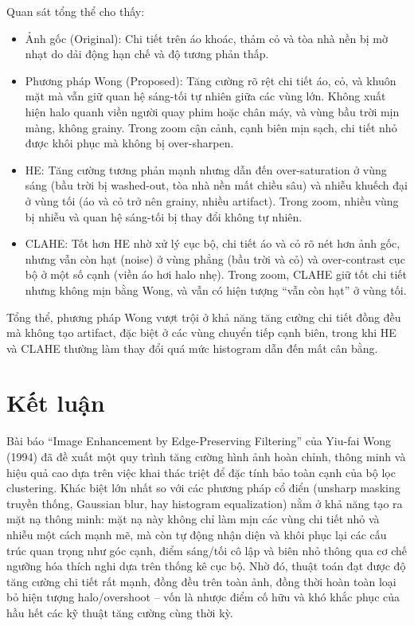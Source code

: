 \documentclass[a4paper]{report}
\begin{document}
Quan sát tổng thể cho thấy:

\begin{itemize}
    \item Ảnh gốc (Original): Chi tiết trên áo khoác, thảm cỏ và tòa nhà nền bị mờ
          nhạt do dải động hạn chế và độ tương phản thấp.
    \item Phương pháp Wong (Proposed): Tăng cường rõ rệt chi tiết áo, cỏ, và khuôn
          mặt mà vẫn giữ quan hệ sáng-tối tự nhiên giữa các vùng lớn. Không xuất hiện
          halo quanh viền người quay phim hoặc chân máy, và vùng bầu trời mịn màng,
          không grainy. Trong zoom cận cảnh, cạnh biên mịn sạch, chi tiết nhỏ được
          khôi phục mà không bị over-sharpen.
    \item HE: Tăng cường tương phản mạnh nhưng dẫn đến over-saturation ở vùng sáng
          (bầu trời bị washed-out, tòa nhà nền mất chiều sâu) và nhiễu khuếch đại ở
          vùng tối (áo và cỏ trở nên grainy, nhiều artifact). Trong zoom, nhiều vùng bị
          nhiễu và quan hệ sáng-tối bị thay đổi không tự nhiên.
    \item CLAHE: Tốt hơn HE nhờ xử lý cục bộ, chi tiết áo và cỏ rõ nét hơn ảnh gốc,
          nhưng vẫn còn hạt (noise) ở vùng phẳng (bầu trời và cỏ) và over-contrast cục
          bộ ở một số cạnh (viền áo hơi halo nhẹ). Trong zoom, CLAHE giữ tốt chi tiết
          nhưng không mịn bằng Wong, và vẫn có hiện tượng ``vẫn còn hạt'' ở vùng tối.
\end{itemize}

Tổng thể, phương pháp Wong vượt trội ở khả năng tăng cường chi tiết đồng đều
mà không tạo artifact, đặc biệt ở các vùng chuyển tiếp cạnh biên, trong khi HE và
CLAHE thường làm thay đổi quá mức histogram dẫn đến mất cân bằng.

\chapter{Kết luận}

Bài báo ``Image Enhancement by Edge-Preserving Filtering'' của Yiu-fai Wong
(1994) đã đề xuất một quy trình tăng cường hình ảnh hoàn chỉnh, thông minh và
hiệu quả cao dựa trên việc khai thác triệt để đặc tính bảo toàn cạnh của bộ lọc
clustering. Khác biệt lớn nhất so với các phương pháp cổ điển (unsharp masking
truyền thống, Gaussian blur, hay histogram equalization) nằm ở khả năng tạo ra
mặt nạ thông minh: mặt nạ này không chỉ làm mịn các vùng chi tiết nhỏ và nhiễu
một cách mạnh mẽ, mà còn tự động nhận diện và khôi phục lại các cấu trúc quan
trọng như góc cạnh, điểm sáng/tối cô lập và biên nhỏ thông qua cơ chế ngưỡng
hóa thích nghi dựa trên thống kê cục bộ. Nhờ đó, thuật toán đạt được độ tăng
cường chi tiết rất mạnh, đồng đều trên toàn ảnh, đồng thời hoàn toàn loại bỏ hiện
tượng halo/overshoot -- vốn là nhược điểm cố hữu và khó khắc phục của hầu hết
các kỹ thuật tăng cường cùng thời kỳ.
\end{document}
